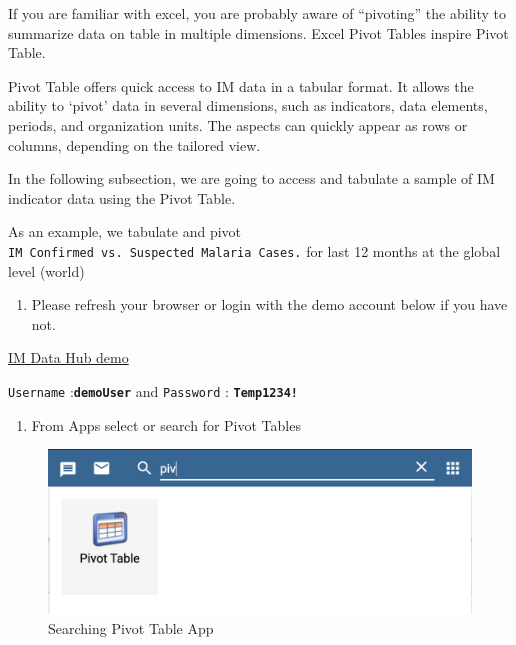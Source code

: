 \documentclass[]{book}
\providecommand{\tightlist}{%
  \setlength{\itemsep}{0pt}\setlength{\parskip}{0pt}}
\begin{document}
If you are familiar with excel, you are probably aware of ``pivoting'' the ability to summarize data on table in multiple dimensions. Excel Pivot Tables inspire Pivot Table.

Pivot Table offers quick access to IM data in a tabular format. It allows the ability to `pivot' data in several dimensions, such as indicators, data elements, periods, and organization units. The aspects can quickly appear as rows or columns, depending on the tailored view.

In the following subsection, we are going to access and tabulate a sample of IM indicator data using the Pivot Table.

As an example, we tabulate and pivot \texttt{IM\ Confirmed\ vs.\ Suspected\ Malaria\ Cases.} for last 12 months at the global level (world)

\begin{enumerate}
\def\labelenumi{\arabic{enumi}.}
\tightlist
\item
  Please refresh your browser or login with the demo account below if you have not.
\end{enumerate}

\href{https://im-dev.psi-mis.org/dhis-web-dataentry/index.action}{IM Data Hub demo}

\texttt{Username} :\textbf{\texttt{demoUser}} and \texttt{Password} : \textbf{\texttt{Temp1234!}}

\begin{enumerate}
\def\labelenumi{\arabic{enumi}.}
\setcounter{enumi}{1}
\tightlist
\item
  From Apps select or search for Pivot Tables
\end{enumerate}

\begin{figure}
\includegraphics[width=15.36in]{./images/pivot-table} \caption{Searching Pivot Table App}\label{fig:pivot-table}
\end{figure}
\end{document}
